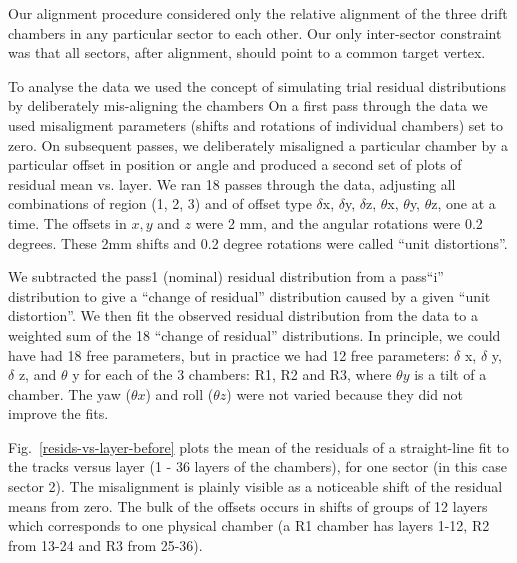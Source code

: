 Our alignment procedure considered only the relative alignment of the
three drift chambers in any particular sector to each other.
Our only inter-sector constraint was that all sectors, after alignment,
should point to a common target vertex.

To analyse the data we used the concept of simulating trial residual
distributions by deliberately mis-aligning the chambers
On a first pass through
the data we used misaligment parameters (shifts and rotations of individual
chambers) set to zero.  On subsequent passes, we deliberately misaligned
a particular chamber by a particular offset in position or angle and 
produced a second set of plots of residual mean vs. layer.  We ran 18 passes
through the data, adjusting all combinations of region (1, 2, 3) and
of offset type $\delta$x, $\delta$y, $\delta$z, $\theta$x, 
$\theta$y, $\theta$z, one at
a time.  The offsets in $x, y$ and $z$ were 2 mm, and the angular rotations
were 0.2 degrees.  These 2mm shifts and 0.2 degree rotations were
called ``unit distortions''.

We subtracted the pass1 (nominal) residual distribution from a pass``i'' distribution
to give a ``change of residual'' distribution caused by a given ``unit distortion''.
We then fit the observed residual distribution from the data to a weighted
sum of the 18 ``change of residual'' distributions.  In principle, we
could have had 18 free parameters, but in practice we had 12 free parameters:
 $\delta$ x, $\delta$ y, $\delta$ z, and $\theta$ y for each of the 3 chambers: R1, R2 and R3,
where $\theta y$ is a tilt of a chamber.  The yaw ($\theta x$) and roll ($\theta z$)
were not varied because they did not improve the fits.

Fig.~\ref{resids-vs-layer-before} plots the mean of the residuals of a straight-line
fit to the tracks versus layer (1 - 36 layers of the chambers), for one sector (in this
case sector 2).
The misalignment is plainly visible as a noticeable shift of the residual means
from zero.  The bulk of the offsets occurs in shifts of groups of 12 layers which
corresponds to one physical chamber (a R1 chamber has layers 1-12, R2 from 13-24 and
R3 from 25-36).  

